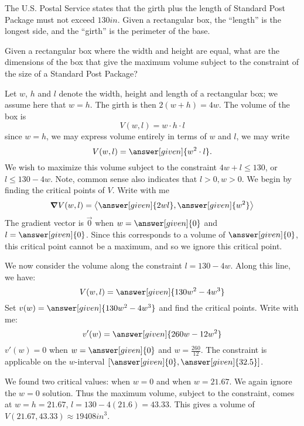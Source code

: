 \documentclass{ximera}
\begin{document}
\begin{example}
  The U.S. Postal Service states that the girth plus the length of
  Standard Post Package must not exceed $130\unit{in}$. Given a
  rectangular box, the ``length'' is the longest side, and the
  ``girth'' is the perimeter of the base.

  Given a rectangular box where the width and height are equal, what
  are the dimensions of the box that give the maximum volume subject
  to the constraint of the size of a Standard Post Package?
  \begin{explanation}
    Let $w$, $h$ and $l$ denote the width, height and length of a
    rectangular box; we assume here that $w=h$. The girth is then
    $2(w+h) = 4w$. The volume of the box is
    \[
    V(w,l) = w\cdot h\cdot l
    \]
    since $w=h$, we may express volume entirely in terms of $w$ and $l$, we may write
    \[
    V(w,l)= \answer[given]{w^2\cdot l}.
    \]
    We wish to maximize this volume subject to the constraint
    $4w+l\leq 130$, or $l\leq 130-4w$. Note, common sense also
    indicates that $l>0, w>0$. We begin by finding the critical points
    of $V$. Write with me
    \[
    \grad V(w,l) = \vector{\answer[given]{2wl},\answer[given]{w^2}}
    \]
    The gradient vector is $\vec{0}$ when $w=\answer[given]{0}$ and
    $l=\answer[given]{0}$. Since this corresponds to a volume of
    $\answer[given]{0}$, this critical point cannot be a maximum, and
    so we ignore this critical point.
    
    We now consider the volume along the constraint $l=130-4w.$ Along this line, we have:
    \[
    V(w,l) = \answer[given]{130w^2-4w^3} 
    \]
    Set $v(w) = \answer[given]{130w^2-4w^3}$ and find the critical points. Write with me:
    \[
    v'(w) = \answer[given]{260w-12w^2}
    \]
    $v'(w)= 0$ when $w = \answer[given]{0}$ and $w= \frac{260}{12}$.
    The constraint is applicable on the $w$-interval
    $[\answer[given]{0},\answer[given]{32.5}]$.



    We found two critical values: when $w=0$ and when $w=21.67$. We
    again ignore the $w=0$ solution. Thus the maximum volume, subject to
    the constraint, comes at $w=h=21.67$, $l = 130-4(21.6) =43.33$.
    This gives a volume of $V(21.67,43.33) \approx 19408\unit{in}^3$.
    

\end{explanation}
\end{example}
\end{document}
